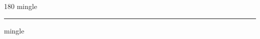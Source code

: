 
\begin{frame}
\begin{center}
\begin{turn}{180}
{\fontsize{2.5cm}{1em}\selectfont mingle}
\end{turn}
\vspace{1em}\par  
\hrule
\vspace{1em}\par  
{\fontsize{2.5cm}{1em}\selectfont mingle}
\end{center}
\end{frame}
